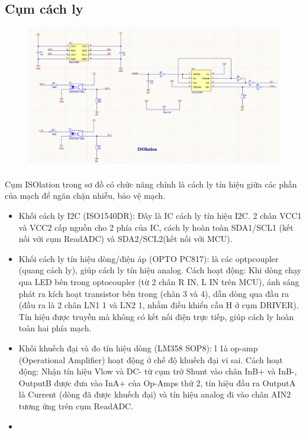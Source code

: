 \subsection{Cụm cách ly}
\begin{figure}[H]
    \centering
    \includegraphics[width=1\textwidth]{pictures/isolation.png}
\end{figure}
Cụm ISOlation trong sơ đồ có chức năng chính là cách ly tín hiệu giữa các phần của mạch để ngăn chặn nhiễu, bảo vệ mạch.
\begin{itemize}
    \item Khối cách ly I2C (ISO1540DR): Đây là IC cách ly tín hiệu I2C. 2 chân VCC1 và VCC2 cấp nguồn cho 2 phía của IC, cách ly hoàn toàn SDA1/SCL1 (kết nối với cụm ReadADC) và SDA2/SCL2(kết nối với MCU).
    \item Khối cách ly tín hiệu dòng/điện áp (OPTO PC817): là các optpcoupler (quang cách ly), giúp cách ly tín hiệu analog. Cách hoạt động: Khi dòng chạy qua LED bên trong optocoupler (từ 2 chân R IN, L IN trên MCU), ánh sáng phát ra kích hoạt transistor bên trong (chân 3 và 4), dẫn dòng qua đầu ra (đầu ra là 2 chân LN1 1 và LN2 1, nhằm điều khiển cầu H ở cụm DRIVER). 
    Tín hiệu được truyền mà không có kết nối điện trực tiếp, giúp cách ly hoàn toàn hai phía mạch.
    \item Khối khuếch đại và đo tín hiệu dòng (LM358 SOP8): l 1à op-amp (Operational Amplifier) hoạt động ở chế độ khuếch đại vi sai. Cách hoạt động: Nhận tín hiệu Vlow và DC- từ cụm trở Shunt vào chân InB+ và InB-, OutputB được đưa vào InA+ của Op-Amps thứ 2, tín hiệu đầu ra OutputA là Current (dòng đã được khuếch đại) và tín hiệu analog đi vào chân AIN2 tương ứng trên cụm ReadADC.
    \item 
\end{itemize}

